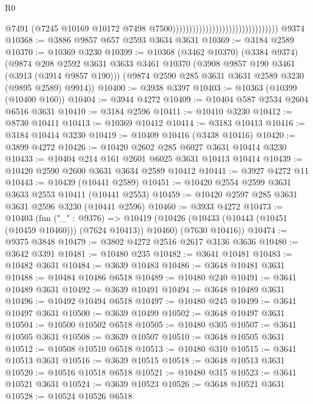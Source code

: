 \begin{lexlean}{R0}
\begin{coremodule}
                                                                  @7491
                                                                  (@7245
                                                                    @10169
                                                                    @10172
                                                                    @7498
                                                                    @7500))))))))))))))))))))))))))))))))
    @9374
@10368 := @3886 @9857 @657 @2593 @3634 @3631
@10369 := @3184 @2589
@10370 := @10369 @3230
@10399 := @10368
    (@3462 @10370)
    (@3384 @9374)
    (@9874
      @208
      @2592
      @3631
      @3633
      @3461
      @10370
      (@3908 @9857 @190 @3461 (@3913 (@3914 @9857 @190)))
      (@9874 @2590 @285 @3631 @3631 @2589 @3230 (@9895 @2589) @9914))
@10400 := @3938 @3397
@10403 := @10363 (@10399 (@10400 @160))
@10404 := @3944 @4272
@10409 := @10404 @587 @2534 @2604 @6516 @3631
@10410 := @3184 @2596
@10411 := @10410 @3230
@10412 := @8730 @10411
@10413 := @10369 @10412
@10414 := @3183 @10413
@10416 := @3184 @10414 @3230
@10419 := @10409 @10416 (@3438 @10416)
@10420 := @3899 @4272
@10426 := @10420 @2602 @285 @6027 @3631 @10414 @3230
@10433 := @10404 @214 @161 @2601 @6025 @3631 @10413 @10414
@10439 := @10420 @2590 @2600 @3631 @3634 @2589 @10412
@10441 := @3927 @4272 @11
@10443 := @10439 (@10441 @2589)
@10451 := @10420 @2554 @2599 @3631 @3633 @2553 @10411 (@10441 @2553)
@10459 := @10420 @2597 @285 @3631 @3631 @2596 @3230 (@10441 @2596)
@10460 := @3933 @4272
@10473 := @10403
    (fun ("_" : @9376) =>
    @10419 (@10426 (@10433 (@10443 (@10451 (@10459 @10460))) (@7624 @10413)) @10460) (@7630 @10416))
@10474 := @9375 @3848
@10479 := @3802 @4272 @2516 @2617 @3136 @3636
@10480 := @3642 @3391
@10481 := @10480 @235
@10482 := @3641 @10481
@10483 := @10482 @3631
@10484 := @3639 @10483
@10486 := @3648 @10481 @3631
@10488 := @10484 @10486 @6518
@10489 := @10480 @240
@10491 := @3641 @10489 @3631
@10492 := @3639 @10491
@10494 := @3648 @10489 @3631
@10496 := @10492 @10494 @6518
@10497 := @10480 @245
@10499 := @3641 @10497 @3631
@10500 := @3639 @10499
@10502 := @3648 @10497 @3631
@10504 := @10500 @10502 @6518
@10505 := @10480 @305
@10507 := @3641 @10505 @3631
@10508 := @3639 @10507
@10510 := @3648 @10505 @3631
@10512 := @10508 @10510 @6518
@10513 := @10480 @310
@10515 := @3641 @10513 @3631
@10516 := @3639 @10515
@10518 := @3648 @10513 @3631
@10520 := @10516 @10518 @6518
@10521 := @10480 @315
@10523 := @3641 @10521 @3631
@10524 := @3639 @10523
@10526 := @3648 @10521 @3631
@10528 := @10524 @10526 @6518

\end{coremodule}
\end{lexlean}
